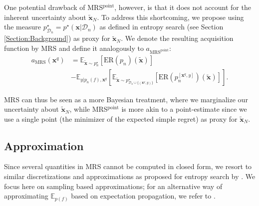 \documentclass[10pt,letterpaper]{article} %
\begin{document}
One potential drawback of MRS$^{\text{point}}$, however,  is that it does not account for
the inherent uncertainty about $\mathbf{\tilde x}_N$. To address this shortcoming, we propose using
the measure $p^\star_{\mathcal{D}_n} = p^\star(\mathbf{x} \vert \mathcal{D}_n)$ as defined in
entropy search (see Section \ref{Section:Background}) as proxy for $\mathbf{\tilde x}_N$.
We denote the resulting acquisition function by MRS and define it analogously to $a_{\text{MRS}^{\text{point}}}$:
\begin{equation*}
\begin{split}
a_{\text{MRS}}(\mathbf{x}^q)
   & = \mathbb{E}_{\mathbf{\tilde x} \sim p^\star_n}[\text{ER}(p_n)(\mathbf{\tilde x})] \\
	  & - \mathbb{E}_{y \vert p_n(f), \mathbf{x}^q}[
		  \mathbb{E}_{\mathbf{\tilde x} \sim p^\star_{\mathcal{D}_n \cup \{(\mathbf{x}^q, y)\}}}[
			 \text{ER}(p^{[\mathbf{x}^q, y]}_n)(\mathbf{\tilde x})]].
\end{split}
\end{equation*}

MRS can thus be seen as a more Bayesian treatment, where we marginalize our
uncertainty about $\mathbf{\tilde x}_N$, while MRS$^\text{point}$ is more akin
to a point-estimate since we use a single point (the minimizer of the expected simple regret)
as proxy for $\mathbf{\tilde x}_N$.

\subsection{Approximation}
Since several quantities in MRS cannot be computed in closed form, we
resort to similar discretizations and approximations as proposed for entropy search by \citet{hennig_entropy_2012}. We
focus here on sampling based approximations; for an alternative way of approximating $\mathbb{E}_{p(f)}$ based on
expectation propagation, we refer to \citet{hennig_entropy_2012}.
\end{document}

